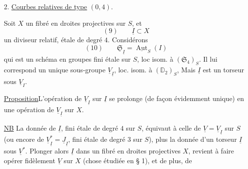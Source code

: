2. \uline{Courbes relatives de type} $(0,4)$.

Soit $X$ un fibré en droites projectives sur $S$, et
\[
(9)\qquad\underline I\subset X
\]
un diviseur relatif, étale de degré $4$. Considérons
\[
(10)\qquad\underline{\mathfrak S}_{\underline I}=\underline{\operatorname{Aut}}_S(I)
\]
qui est un schéma en groupes fini étale sur $S$, loc isom. à $(\mathfrak S_4)_S$. Il lui correspond un unique sous-groupe  $\underline V_{\underline I}$, loc. isom. à $(\mathbb D_2)_S$,  Mais $\underline I$ est un torseur sous $\underline V_I$.

\uline{Proposition}\quad L'opération de $\underline V_{\underline I}$ sur $\underline I$ se prolonge (de façon évidemment unique) en une opération de $\underline V_{\underline I}$ sur $X$.

\uline{NB} La donnée de $\underline I$, fini étale de degré $4$ sur $S$, équivaut à celle de $\underline V=\underline V_{\underline I}$ sur $S$ (ou encore de $\underline V_{\underline I}^*=\underline J_{\underline I}$, fini étale de degré $3$ sur $S$), plus la donnée d'un torseur $\underline I$ sous $\underline V^*$. Plonger alors $\underline I$ dans un fibré en droites projectives $X$, revient à faire opérer fidèlement $\underline V$ sur $X$ (chose étudiée en § 1), et de plus, de 
